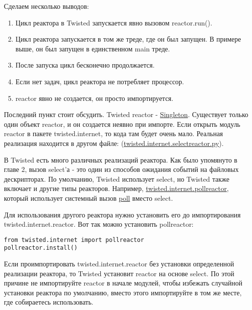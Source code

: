 Сделаем несколько выводов:

\begin{enumerate}
\item Цикл реактора в Twisted запускается явно вызовом reactor.run().

\item Цикл реактора запускается в том же треде, где он 
был запущен. В примере выше, он был запущен в единственном main треде. 

\item После запуска цикл бесконечно продолжается.

\item Если нет задач, цикл реактора не потребляет процессор.

\item reactor явно не создается, он просто импортируется.
\end{enumerate}


Последний пункт стоит обсудить. Twisted reactor -  
\href{http://en.wikipedia.org/wiki/Singleton\_pattern}{Singleton}. 
Существует только один объект reactor, и он создается неявно при импорте. 
Если открыть модуль reactor в пакете twisted.internet, то кода там будет 
очень мало. Реальная реализация находится в другом файле:
\newline (\href{http://twistedmatrix.com/trac/browser/tags/releases/twisted-8.2.0/twisted/internet/selectreactor.py}{twisted.internet.selectreactor.py}).


В Twisted есть много различных реализаций реактора. Как было упомянуто 
в главе 2, вызов select'а - это один из способов ожидания событий на 
файловых дескрипторах. По умолчанию, Twisted использует select, 
но Twisted также включает и другие типы реакторов. Например, 
\href{http://twistedmatrix.com/trac/browser/tags/releases/twisted-8.2.0/twisted/internet/pollreactor.py}{twisted.internet.pollreactor}, который использует системный вызов 
\href{http://www.makelinux.net/ldd3/chp-6-sect-3.shtml}{poll} вместо 
select.


Для использования другого реактора нужно установить его до 
импортирования twisted.internet.reactor. Вот так можно 
установить pollreactor:

 \begin{verbatim}
from twisted.internet import pollreactor
pollreactor.install()
\end{verbatim} 


Если проимпортировать twisted.internet.reactor без 
установки определенной реализации реактора, то 
Twisted установит reactor на основе select. 
По этой причине не импортируйте reactor в начале 
модулей, чтобы избежать случайной установки 
реактора по умолчанию, вместо этого импортируйте 
в том же месте, где собираетесь использовать.


